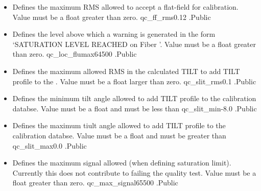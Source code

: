 \begin{itemize}
\item {}
{Defines the maximum RMS allowed to accept a flat-field for calibration. Value must be a float greater than zero.}
{qc\_ff\_rms}{0.12}
{\calFFraw}{\constantsfile}{\calFFraw.\progMAIN}{Public}

\item {}
{Defines the level above which a warning is generated in the form `SATURATION LEVEL REACHED on Fiber '. Value must be a float greater than zero.}
{qc\_loc\_flumax}{64500}
{\calFFraw}{\constantsfile}{\calFFraw.\progMAIN}{Public}

\item {} 
{Defines the maximum allowed RMS in the calculated TILT to add TILT profile to the \calibdb. Value must be a float larger than zero.}
{qc\_slit\_rms}{0.1}
{\calSLIT}{\constantsfile}{\calSLIT.\progMAIN}{Public}

\item {} 
{Defines the minimum tilt angle allowed to add TILT profile to the calibration databse. Value must be a float and must be less than }
{qc\_slit\_min}{-8.0}
{\calSLIT}{\constantsfile}{\calSLIT.\progMAIN}{Public}

\item {} 
{Defines the maximum tiult angle allowed to add TILT profile to the calibration databse. Value must be a float and must be greater than }
{qc\_slit\_max}{0.0}
{\calSLIT}{\constantsfile}{\calSLIT.\progMAIN}{Public}

\item {} 
{Defines the maximum signal allowed (when defining saturation limit). Currently this does not contribute to failing the quality test. Value must be a float greater than zero.}
{qc\_max\_signal}{65500}
{\calextractRAW}{\constantsfile}{\calextractRAW.\progMAIN}{Public}


\end{itemize}







